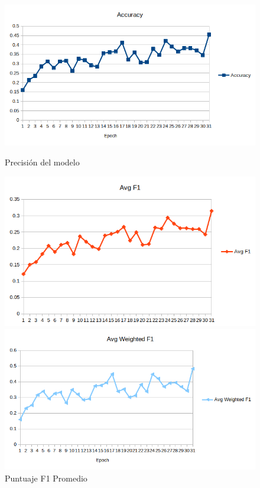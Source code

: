 \begin{figure}[htbp]
    \centering
    \begin{minipage}[b]{0.495\textwidth}
        \centering
        \includegraphics[width=\textwidth]{images/Accuracytable.png}
        \caption{Precisión del modelo}
        \label{fig:accuracy}
    \end{minipage}
    \hfill
    \begin{minipage}[b]{0.495\textwidth}
        \centering
        \includegraphics[width=\textwidth]{images/Avgf1table.png}
        \caption{Puntuaje F1 Promedio}
        \label{fig:avgf1}
    \end{minipage}
    \vfill
    \begin{minipage}[b]{0.495\textwidth}
        \centering
        \includegraphics[width=\textwidth]{images/Avgweightedf1table.png}

\end{minipage}
\end{figure}
